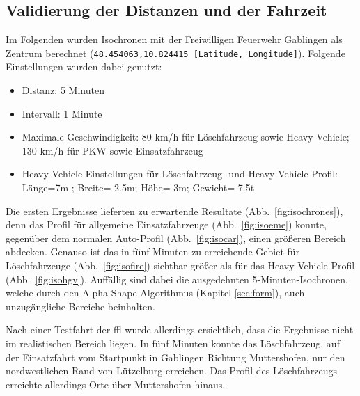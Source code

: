 \newpage
\subsection{Validierung der Distanzen und der Fahrzeit}

Im Folgenden wurden Isochronen mit der Freiwilligen Feuerwehr Gablingen als Zentrum berechnet (\texttt{48.454063,10.824415 [Latitude, Longitude]}).
Folgende Einstellungen wurden dabei genutzt:
\sloppy
\begin{itemize}
\item Distanz: 5 Minuten
\item Intervall: 1 Minute
\item Maximale Geschwindigkeit: 80 km/h für Löschfahrzeug sowie Heavy-Vehicle; 130 km/h für PKW sowie Einsatzfahrzeug
\item Heavy-Vehicle-Einstellungen für Löschfahrzeug- und Heavy-Vehicle-Profil: Länge=7m ; Breite= 2.5m; Höhe= 3m; Gewicht= 7.5t
\end{itemize}
\fussy

Die ersten Ergebnisse lieferten zu erwartende Resultate (Abb.~\ref{fig:isochrones}), denn das Profil für allgemeine Einsatzfahrzeuge (Abb.~\ref{fig:isoeme}) konnte, gegenüber dem normalen Auto-Profil (Abb.~\ref{fig:isocar}), einen größeren Bereich abdecken.
Genauso ist das in fünf Minuten zu erreichende Gebiet für Löschfahrzeuge (Abb.~\ref{fig:isofire}) sichtbar größer als für das Heavy-Vehicle-Profil (Abb.~\ref{fig:isohgv}).
Auffällig sind dabei die ausgedehnten 5-Minuten-Isochronen, welche durch den Alpha-Shape Algorithmus (Kapitel \ref{sec:form}), auch unzugängliche Bereiche beinhalten.

Nach einer Testfahrt der \gls{ffl} wurde allerdings ersichtlich, dass die Ergebnisse nicht im realistischen Bereich liegen.
In fünf Minuten konnte das Löschfahrzeug, auf der Einsatzfahrt vom Startpunkt in Gablingen Richtung Muttershofen, nur den nordwestlichen Rand von Lützelburg erreichen.
Das Profil des Löschfahrzeugs erreichte allerdings Orte über Muttershofen hinaus.

